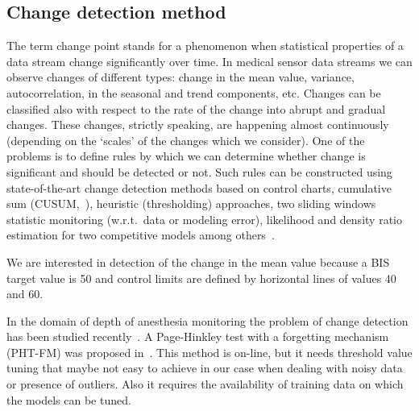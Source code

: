 \subsection{Change detection method}
\label{sec:ChangeDetectionMechanism}
%
The term change point stands for a phenomenon when statistical
properties of a data stream change significantly over time.
%
In medical sensor data streams we can observe changes of different
types: change in the mean value, variance, autocorrelation, in the
seasonal and trend components, etc. Changes can be classified also
with respect to the rate of the change into abrupt and gradual
changes. These changes, strictly speaking, are happening almost
continuously (depending on the `scales' of the changes which we
consider). One of the problems is to define rules by which we can
determine whether change is significant and should be detected
or not.
%
Such rules can be constructed using state-of-the-art change detection
methods based on control charts, cumulative sum (CUSUM,~\cite{Cusum}),
heuristic (thresholding) approaches, two sliding windows statistic
monitoring (w.r.t.\ data or modeling error), likelihood and density
ratio estimation for two competitive models among others~\cite{Nikiforov}.

We are interested in detection of the change in the mean value because
a BIS target value is 50 and control limits are defined by horizontal
lines of values 40 and 60.

In the domain of depth of anesthesia monitoring the problem of change
detection has been studied recently~\cite{GamaDecisionSupportSystems}.
A Page-Hinkley test with a forgetting mechanism (PHT-FM) was proposed
in~\cite{GamaRealTimeAlg}. This method is
on-line, %
but it needs threshold value tuning that maybe not easy to achieve in
our case when dealing with noisy data or presence of outliers. Also it
requires the availability of training data on which the models can be
tuned.

